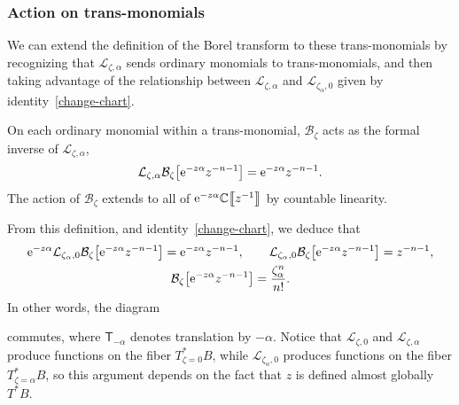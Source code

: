 \documentclass[10pt,a4paper]{amsart}
\newcommand{\C}{\mathbb{C}}
\newcommand{\laplace}{\mathcal{L}}
\newcommand{\borel}{\mathcal{B}}
\numberwithin{equation}{section}
\begin{document}
\subsubsection{Action on trans-monomials}\label{sec:action_transseries}
%
We can extend the definition of the Borel transform to these trans-monomials by recognizing that $\laplace_{\zeta, \alpha}$ sends ordinary monomials to trans-monomials, and then taking advantage of the relationship between $\laplace_{\zeta, \alpha}$ and $\laplace_{\zeta_\alpha, 0}$ given by identity~\eqref{change-chart}.
\begin{Definition}
On each ordinary monomial within a trans-monomial, $\borel_\zeta$ acts as the formal inverse of $\laplace_{\zeta,\alpha}$,
\[
\laplace_{\zeta,\alpha}\borel_\zeta\bigl[{\rm e}^{-z\alpha} z^{-n-1} \bigr]={\rm e}^{-z\alpha} z^{-n-1}.
\]
The action of $\borel_\zeta$ extends to all of ${\rm e}^{-z\alpha} \C\big\llbracket z^{-1} \big\rrbracket$ by countable linearity.
\end{Definition}
From this definition, and identity~\eqref{change-chart}, we deduce that
\begin{gather*}
{\rm e}^{-z\alpha}\laplace_{\zeta_\alpha,0}\borel_\zeta\bigl[{\rm e}^{-z\alpha} z^{-n-1}\bigr] = {\rm e}^{-z\alpha} z^{-n-1} ,\qquad
\laplace_{\zeta_\alpha,0}\borel_\zeta\bigl[{\rm e}^{-z\alpha} z^{-n-1}\bigr] = z^{-n-1} ,\\
\borel_{\zeta}\bigl[{\rm e}^{-z\alpha}z^{-n-1}\bigr] = \frac{\zeta_\alpha^n}{n!}.
\end{gather*}
In other words, the diagram
\begin{center}
\end{center}
commutes, where $\mathsf{T}_{-\alpha}$ denotes translation by $-\alpha$. Notice that $\laplace_{\zeta, 0}$ and $\laplace_{\zeta, \alpha}$ produce functions on the fiber $T^*_{\zeta = 0}B$, while $\laplace_{\zeta_\alpha, 0}$ produces functions on the fiber $T^*_{\zeta = \alpha}B$, so this argument depends on the fact that $z$ is defined almost globally $T^*B$.
\end{document}
